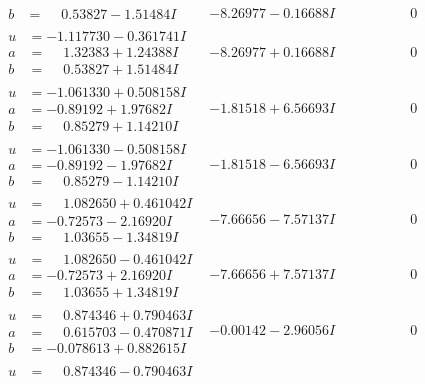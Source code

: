 \documentclass[1p]{elsarticle_modified}
\theoremstyle{definition}
\begin{document}
$$\begin{array}{c|c|c}
\begin{aligned}
b &= \phantom{-}0.53827 - 1.51484 I\end{aligned}
 & -8.26977 - 0.16688 I & \phantom{-0.000000 } 0 \\ \hline\begin{aligned}
u &= -1.117730 - 0.361741 I \\
a &= \phantom{-}1.32383 + 1.24388 I \\
b &= \phantom{-}0.53827 + 1.51484 I\end{aligned}
 & -8.26977 + 0.16688 I & \phantom{-0.000000 } 0 \\ \hline\begin{aligned}
u &= -1.061330 + 0.508158 I \\
a &= -0.89192 + 1.97682 I \\
b &= \phantom{-}0.85279 + 1.14210 I\end{aligned}
 & -1.81518 + 6.56693 I & \phantom{-0.000000 } 0 \\ \hline\begin{aligned}
u &= -1.061330 - 0.508158 I \\
a &= -0.89192 - 1.97682 I \\
b &= \phantom{-}0.85279 - 1.14210 I\end{aligned}
 & -1.81518 - 6.56693 I & \phantom{-0.000000 } 0 \\ \hline\begin{aligned}
u &= \phantom{-}1.082650 + 0.461042 I \\
a &= -0.72573 - 2.16920 I \\
b &= \phantom{-}1.03655 - 1.34819 I\end{aligned}
 & -7.66656 - 7.57137 I & \phantom{-0.000000 } 0 \\ \hline\begin{aligned}
u &= \phantom{-}1.082650 - 0.461042 I \\
a &= -0.72573 + 2.16920 I \\
b &= \phantom{-}1.03655 + 1.34819 I\end{aligned}
 & -7.66656 + 7.57137 I & \phantom{-0.000000 } 0 \\ \hline\begin{aligned}
u &= \phantom{-}0.874346 + 0.790463 I \\
a &= \phantom{-}0.615703 - 0.470871 I \\
b &= -0.078613 + 0.882615 I\end{aligned}
 & -0.00142 - 2.96056 I & \phantom{-0.000000 } 0 \\ \hline\begin{aligned}
u &= \phantom{-}0.874346 - 0.790463 I \\

\end{aligned}
\end{array}$$
\end{document}
